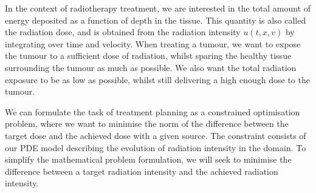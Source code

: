 





In the context of radiotherapy treatment, we are interested in the total amount of energy deposited as a function of depth in the tissue. This quantity is also called the radiation dose, and is obtained from the radiation intensity $u(t,x,v)$ by integrating over time and velocity. When treating a tumour, we want to expose the tumour to a sufficient dose of radiation, whilst sparing the healthy tissue surrounding the tumour as much as possible. We also want the total radiation exposure to be as low as possible, whilst still delivering a high enough dose to the tumour. 

We can formulate the task of treatment planning as a constrained optimisation problem, where we want to minimise the norm of the difference between the target dose and the achieved dose with a given source. The constraint consists of our PDE model describing the evolution of radiation intensity in the domain. To simplify the mathematical problem formulation, we will seek to minimise the difference between a target radiation intensity and the achieved radiation intensity.

